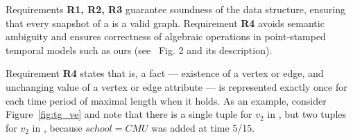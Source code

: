 Requirements {\bf R1, R2, R3} guarantee soundness of the \tg data
structure, ensuring that every snapshot of a \tg is a valid graph.
Requirement {\bf R4} avoids semantic ambiguity and ensures correctness
of algebraic operations in point-stamped temporal models such as ours
(see~\cite{DBLP:reference/db/JensenS09k} Fig. 2 and its description).

Requirement {\bf R4} states that is, a fact --- existence of a vertex
or edge, and unchanging value of a vertex or edge attribute --- is
represented exactly once for each time period of maximal length when
it holds. As an example, consider Figure~\ref{fig:tg_ve} and note that
there is a single tuple for $v_2$ in \tv, but two tuples for $v_2$ in
\tav, because $school=CMU$ was added at time 5/15.
  



